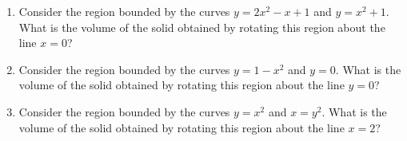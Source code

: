 \begin{enumerate}[ref={\fcProblemRef}]~
\item  \label{problemVolumeRegionBoundedByy=2x^2-x+1,y=x^2+1rotatedAroundx=0} Consider the region bounded by the curves $y = 2x^2-x+1$ and $y =x^2+1$. What is the volume of the solid obtained by rotating this region about the line $x = 0$?

\item Consider the region bounded by the curves $y = 1-x^2$ and $y =0$. What is the volume of the solid obtained by
rotating this region about the line $y = 0$?

\item Consider the region bounded by the curves $y = x^2$ and $x = y^2$. What is the volume of the solid obtained by
rotating this region about the line $x = 2$?



\end{enumerate}
